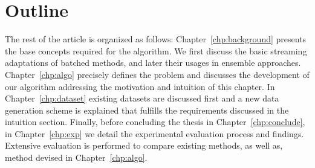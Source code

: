 \section{Outline}
The rest of the article is organized as follows: Chapter~\ref{chp:background} presents the base concepts required for the algorithm. We first discuss the basic streaming adaptations of batched methods, and later their usages in ensemble approaches. Chapter~\ref{chp:algo} precisely defines the problem and discusses the development of our algorithm addressing the motivation and intuition of this chapter. In Chapter~\ref{chp:dataset} existing datasets are discussed first and a new data generation scheme is explained that fulfills the requirements discussed in the intuition section. Finally, before concluding the thesis in Chapter~\ref{chp:conclude}, in Chapter~\ref{chp:exp} we detail the experimental evaluation process and findings. Extensive evaluation is performed to compare existing methods, as well as, method devised in Chapter~\ref{chp:algo}. 
